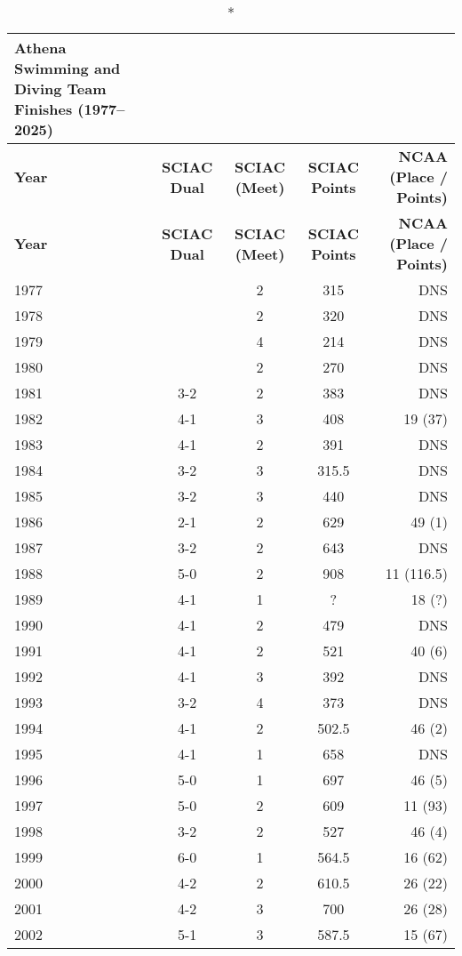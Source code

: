 \begin{longtable}{lcccr}
\caption*{\textbf{\textcolor{teamprimary}{Athena Swimming and Diving Team Finishes (1977–2025)}}} \\
\toprule
\textbf{Year} & \textbf{SCIAC Dual} & \textbf{SCIAC (Meet)} & \textbf{SCIAC Points} & \textbf{NCAA (Place / Points)} \\
\midrule
\endfirsthead

\toprule
\rowcolor{teamprimary!25}
\textbf{Year} & \textbf{SCIAC Dual} & \textbf{SCIAC (Meet)} & \textbf{SCIAC Points} & \textbf{NCAA (Place / Points)} \\
\midrule
\endhead

\bottomrule
\endfoot

1977 &  & 2 & 315 & DNS \\
1978 &  & 2 & 320 & DNS \\
1979 &  & 4 & 214 & DNS \\
1980 &  & 2 & 270 & DNS \\
1981 & 3-2 & 2 & 383 & DNS \\
1982 & 4-1 & 3 & 408 & 19 (37) \\
1983 & 4-1 & 2 & 391 & DNS \\
1984 & 3-2 & 3 & 315.5 & DNS \\
1985 & 3-2 & 3 & 440 & DNS \\
1986 & 2-1 & 2 & 629 & 49 (1) \\
1987 & 3-2 & 2 & 643 & DNS \\
1988 & 5-0 & 2 & 908 & 11 (116.5) \\
1989 & 4-1 & 1 & ? & 18 (?) \\
1990 & 4-1 & 2 & 479 & DNS \\
1991 & 4-1 & 2 & 521 & 40 (6) \\
1992 & 4-1 & 3 & 392 & DNS \\
1993 & 3-2 & 4 & 373 & DNS \\
1994 & 4-1 & 2 & 502.5 & 46 (2) \\
1995 & 4-1 & 1 & 658 & DNS \\
1996 & 5-0 & 1 & 697 & 46 (5) \\
1997 & 5-0 & 2 & 609 & 11 (93) \\
1998 & 3-2 & 2 & 527 & 46 (4) \\
1999 & 6-0 & 1 & 564.5 & 16 (62) \\
2000 & 4-2 & 2 & 610.5 & 26 (22) \\
2001 & 4-2 & 3 & 700 & 26 (28) \\
2002 & 5-1 & 3 & 587.5 & 15 (67) \\

\end{longtable}
